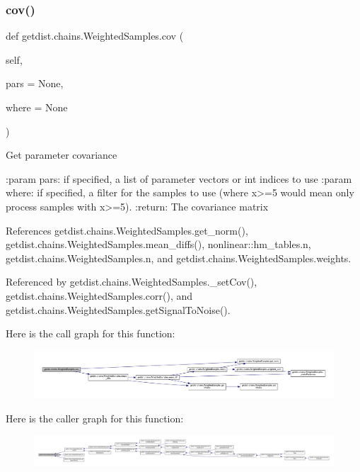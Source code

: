 \subsubsection{\texorpdfstring{cov()}{cov()}}
{\footnotesize\ttfamily def getdist.\+chains.\+Weighted\+Samples.\+cov (\begin{DoxyParamCaption}\item[{}]{self,  }\item[{}]{pars = {\ttfamily None},  }\item[{}]{where = {\ttfamily None} }\end{DoxyParamCaption})}

\begin{DoxyVerb}Get parameter covariance 

:param pars: if specified, a list of parameter vectors or int indices to use
:param where: if specified, a filter for the samples to use (where x>=5 would mean only process samples with x>=5).
:return: The covariance matrix
\end{DoxyVerb}
 

References getdist.\+chains.\+Weighted\+Samples.\+get\+\_\+norm(), getdist.\+chains.\+Weighted\+Samples.\+mean\+\_\+diffs(), nonlinear\+::hm\+\_\+tables.\+n, getdist.\+chains.\+Weighted\+Samples.\+n, and getdist.\+chains.\+Weighted\+Samples.\+weights.



Referenced by getdist.\+chains.\+Weighted\+Samples.\+\_\+set\+Cov(), getdist.\+chains.\+Weighted\+Samples.\+corr(), and getdist.\+chains.\+Weighted\+Samples.\+get\+Signal\+To\+Noise().

Here is the call graph for this function\+:
\nopagebreak
\begin{figure}[H]
\begin{center}
\leavevmode
\includegraphics[width=350pt]{classgetdist_1_1chains_1_1WeightedSamples_a61a1250aa6f6292f59f2e24e9df364f0_cgraph}
\end{center}
\end{figure}
Here is the caller graph for this function\+:
\nopagebreak
\begin{figure}[H]
\begin{center}
\leavevmode
\includegraphics[width=350pt]{classgetdist_1_1chains_1_1WeightedSamples_a61a1250aa6f6292f59f2e24e9df364f0_icgraph}
\end{center}
\end{figure}
\mbox{\label{classgetdist_1_1chains_1_1WeightedSamples_a5369d0f11ce50fafc68a3979134d3593}} 
